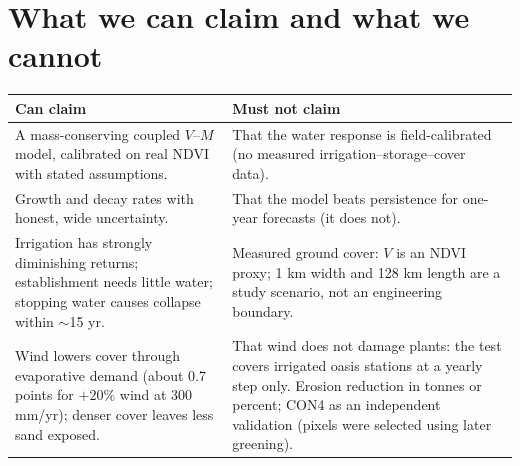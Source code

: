 \documentclass[11pt,a4paper]{article}
\begin{document}
\section{What we can claim and what we cannot}
\begin{tabularx}{\textwidth}{@{}YY@{}}
\toprule
Can claim & Must not claim\\
\midrule
A mass-conserving coupled $V$--$M$ model, calibrated on real NDVI with stated assumptions. &
That the water response is field-calibrated (no measured irrigation--storage--cover data). \\
Growth and decay rates with honest, wide uncertainty. &
That the model beats persistence for one-year forecasts (it does not). \\
Irrigation has strongly diminishing returns; establishment needs little water; stopping water causes collapse within $\sim$15 yr. &
Measured ground cover: $V$ is an NDVI proxy; 1 km width and 128 km length are a study scenario, not an engineering boundary. \\
Wind lowers cover through evaporative demand (about 0.7 points for $+20\%$ wind at 300 mm/yr); denser cover leaves less sand exposed. &
That wind does not damage plants: the test covers irrigated oasis stations at a yearly step only. Erosion reduction in tonnes or percent; CON4 as an independent validation (pixels were selected using later greening). \\
\bottomrule
\end{tabularx}

\end{document}
